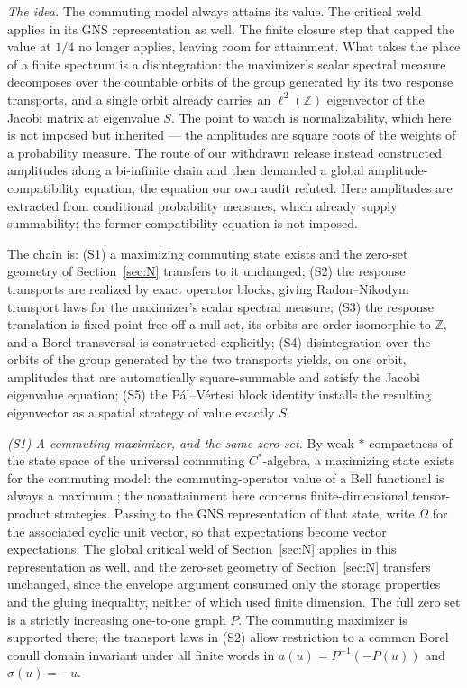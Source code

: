 \documentclass[11pt]{article}
\theoremstyle{remark}
\begin{document}
\emph{The idea.} The commuting model always attains its value. The critical
weld applies in its GNS representation as well. The finite closure step
that capped the value at $1/4$ no longer applies, leaving room for
attainment. What takes the place of a finite
spectrum is a disintegration: the maximizer's scalar spectral measure
decomposes over the countable orbits of the group generated by its two
response transports, and a single orbit already carries an
$\ell^2(\mathbb{Z})$ eigenvector of the Jacobi matrix at eigenvalue $S$. The
point to watch is normalizability, which here is not imposed but inherited
--- the amplitudes are square roots of the weights of a probability measure.
The route of our withdrawn release instead constructed amplitudes along a
bi-infinite chain and then demanded a global amplitude-compatibility
equation, the equation our own audit refuted. Here amplitudes are extracted
from conditional probability measures, which already supply summability;
the former compatibility equation is not imposed.

The chain is: (S1) a maximizing commuting state exists and the zero-set
geometry of Section~\ref{sec:N} transfers to it unchanged; (S2) the response
transports are realized by exact operator blocks, giving Radon--Nikodym
transport laws for the maximizer's scalar spectral measure; (S3) the
response translation is fixed-point free off a null set, its orbits are
order-isomorphic to $\mathbb{Z}$, and a Borel transversal is constructed
explicitly; (S4) disintegration over the orbits of the group generated by
the two transports yields, on one orbit, amplitudes that are automatically
square-summable and satisfy the Jacobi eigenvalue equation; (S5) the
P\'al--V\'ertesi block identity installs the resulting eigenvector as a
spatial strategy of value exactly $S$.

\emph{(S1) A commuting maximizer, and the same zero set.}
By weak-$*$ compactness of the state space of the universal commuting
$C^*$-algebra, a maximizing state exists for the commuting model: the
commuting-operator value of a Bell functional is always a maximum
\cite{Fritz,Junge}; the nonattainment here concerns finite-dimensional
tensor-product strategies.
Passing to the GNS representation of that state, write $\Omega$ for the
associated cyclic unit vector, so that expectations become vector
expectations. The global critical weld of Section~\ref{sec:N} applies in
this representation as well, and the zero-set geometry of
Section~\ref{sec:N} transfers unchanged, since the envelope argument
consumed only the storage properties and the gluing inequality, neither of
which used finite dimension. The full zero set is a strictly increasing
one-to-one graph $P$. The commuting maximizer is supported there;
the transport laws in (S2) allow restriction to a common Borel conull
domain invariant under all finite words in
$a(u)=P^{-1}(-P(u))$ and $\sigma(u)=-u$.
\end{document}
